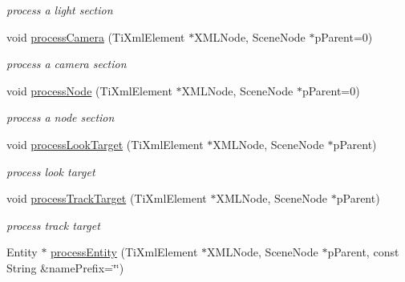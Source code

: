 \begin{DoxyCompactItemize}
\begin{DoxyCompactList}\small\item\em process a light section \end{DoxyCompactList}\item 
void \hyperlink{class_ogre_1_1_dot_scene_loader_a92989e4631cd46d31337c006b46c1aea}{process\+Camera} (Ti\+Xml\+Element $\ast$X\+M\+L\+Node, Scene\+Node $\ast$p\+Parent=0)
\begin{DoxyCompactList}\small\item\em process a camera section \end{DoxyCompactList}\item 
void \hyperlink{class_ogre_1_1_dot_scene_loader_ae84828e86b8e34f1b43ff8e5fc006587}{process\+Node} (Ti\+Xml\+Element $\ast$X\+M\+L\+Node, Scene\+Node $\ast$p\+Parent=0)\hypertarget{class_ogre_1_1_dot_scene_loader_ae84828e86b8e34f1b43ff8e5fc006587}{}\label{class_ogre_1_1_dot_scene_loader_ae84828e86b8e34f1b43ff8e5fc006587}

\begin{DoxyCompactList}\small\item\em process a node section \end{DoxyCompactList}\item 
void \hyperlink{class_ogre_1_1_dot_scene_loader_a3f8227871f6a283222b1d0a88076d6d8}{process\+Look\+Target} (Ti\+Xml\+Element $\ast$X\+M\+L\+Node, Scene\+Node $\ast$p\+Parent)
\begin{DoxyCompactList}\small\item\em process look target \end{DoxyCompactList}\item 
void \hyperlink{class_ogre_1_1_dot_scene_loader_a8b9d37f443c59ea8409a7b2c954bc326}{process\+Track\+Target} (Ti\+Xml\+Element $\ast$X\+M\+L\+Node, Scene\+Node $\ast$p\+Parent)\hypertarget{class_ogre_1_1_dot_scene_loader_a8b9d37f443c59ea8409a7b2c954bc326}{}\label{class_ogre_1_1_dot_scene_loader_a8b9d37f443c59ea8409a7b2c954bc326}

\begin{DoxyCompactList}\small\item\em process track target \end{DoxyCompactList}\item 
Entity $\ast$ \hyperlink{class_ogre_1_1_dot_scene_loader_a5bda9ab5afc1f5e8ada8696739d7cf26}{process\+Entity} (Ti\+Xml\+Element $\ast$X\+M\+L\+Node, Scene\+Node $\ast$p\+Parent, const String \&name\+Prefix=\char`\"{}\char`\"{})\hypertarget{class_ogre_1_1_dot_scene_loader_a5bda9ab5afc1f5e8ada8696739d7cf26}{}\label{class_ogre_1_1_dot_scene_loader_a5bda9ab5afc1f5e8ada8696739d7cf26}


\end{DoxyCompactItemize}
